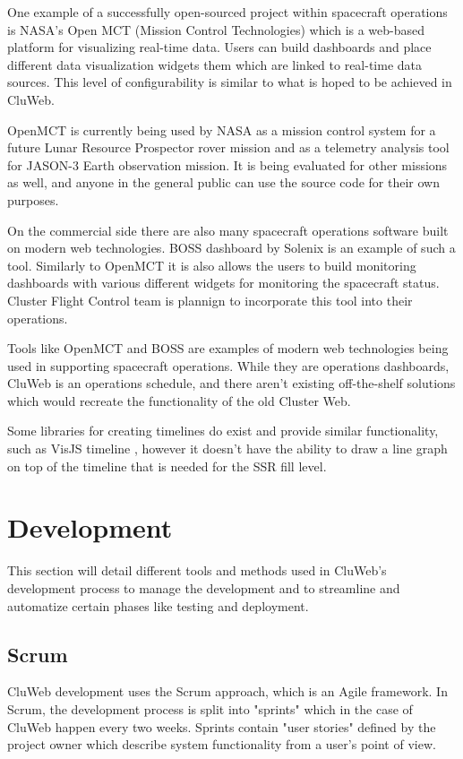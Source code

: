 One example of a successfully open-sourced project within spacecraft operations is NASA's Open MCT (Mission Control Technologies) which is a web-based platform for visualizing real-time data. Users can build dashboards and place different data visualization widgets them which are linked to real-time data sources. This level of configurability is similar to what is hoped to be achieved in CluWeb.

OpenMCT is currently being used by NASA as a mission control system for a future Lunar Resource Prospector rover mission and as a telemetry analysis tool for JASON-3 Earth observation mission. It is being evaluated for other missions as well, and anyone in the general public can use the source code for their own purposes.

\cite{trimble2014reconfigurable, trimble2016open}

On the commercial side there are also many spacecraft operations software built on modern web technologies. BOSS dashboard by Solenix is an example of such a tool. Similarly to OpenMCT it is also allows the users to build monitoring dashboards with various different widgets for monitoring the spacecraft status. Cluster Flight Control team is plannign to incorporate this tool into their operations.
\cite{boss}

Tools like OpenMCT and BOSS are examples of modern web technologies being used in supporting spacecraft operations. While they are operations dashboards, CluWeb is an operations schedule, and there aren't existing off-the-shelf solutions which would recreate the functionality of the old Cluster Web. 

Some libraries for creating timelines do exist and provide similar functionality, such as VisJS timeline \cite{visjs}, however it doesn't have the ability to draw a line graph on top of the timeline that is needed for the SSR fill level.

\section{Development}
This section will detail different tools and methods used in CluWeb's development process to manage the development and to streamline and automatize certain phases like testing and deployment.

\subsection{Scrum}
CluWeb development uses the Scrum approach, which is an Agile framework.
In Scrum, the development process is split into "sprints" which in the case of CluWeb happen every two weeks. Sprints contain "user stories" defined by the project owner which describe system functionality from a user's point of view.

